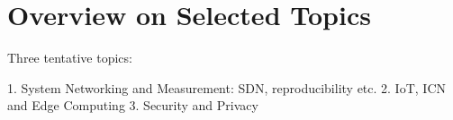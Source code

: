 \section{Overview on Selected Topics} \label{sec:content}

Three tentative topics: 

1. System Networking and Measurement: SDN, reproducibility etc.
2. IoT, ICN and Edge Computing
3. Security and Privacy
